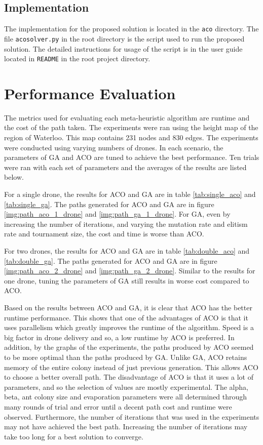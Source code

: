 \documentclass[conference]{IEEEtran}
\begin{document}
\subsection{Implementation}
The implementation for the proposed solution is located in the \verb|aco| directory. The file \verb|acosolver.py| in the root directory is the script used to run the proposed solution. The detailed instructions for usage of the script is in the user guide located in \verb|README| in the root project directory. 

\section{Performance Evaluation}
The metrics used for evaluating each meta-heuristic algorithm are runtime and the cost of the path taken. The experiments were ran using the height map of the region of Waterloo. This map contains 231 nodes and 830 edges. The experiments were conducted using varying numbers of drones. In each scenario, the parameters of GA and ACO are tuned to achieve the best performance. Ten trials were ran with each set of parameters and the averages of the results are listed below.

For a single drone, the results for ACO and GA are in table \ref{tab:single_aco} and \ref{tab:single_ga}. The paths generated for ACO and GA are in figure \ref{img:path_aco_1_drone} and \ref{img:path_ga_1_drone}. For GA, even by increasing the number of iterations, and varying the mutation rate and elitism rate and tournament size, the cost and time is worse than ACO.

For two drones, the results for ACO and GA are in table \ref{tab:double_aco} and \ref{tab:double_ga}. The paths generated for ACO and GA are in figure \ref{img:path_aco_2_drone} and \ref{img:path_ga_2_drone}. Similar to the results for one drone, tuning the parameters of GA still results in worse cost compared to ACO. 

Based on the results between ACO and GA, it is clear that ACO has the better runtime performance. This shows that one of the advantages of ACO is that it uses parallelism which greatly improves the runtime of the algorithm. Speed is a big factor in drone delivery and so, a low runtime by ACO is preferred. In addition, by the graphs of the experiments, the paths produced by ACO seemed to be more optimal than the paths produced by GA. Unlike GA, ACO retains memory of the entire colony instead of just previous generation. This allows ACO to choose a better overall path. The disadvantage of ACO is that it uses a lot of parameters, and so the selection of values are mostly experimental. The alpha, beta, ant colony size and evaporation parameters were all determined through many rounds of trial and error until a decent path cost and runtime were observed. Furthermore, the number of iterations that was used in the experiments may not have achieved the best path. Increasing the number of iterations may take too long for a best solution to converge.
\end{document}
